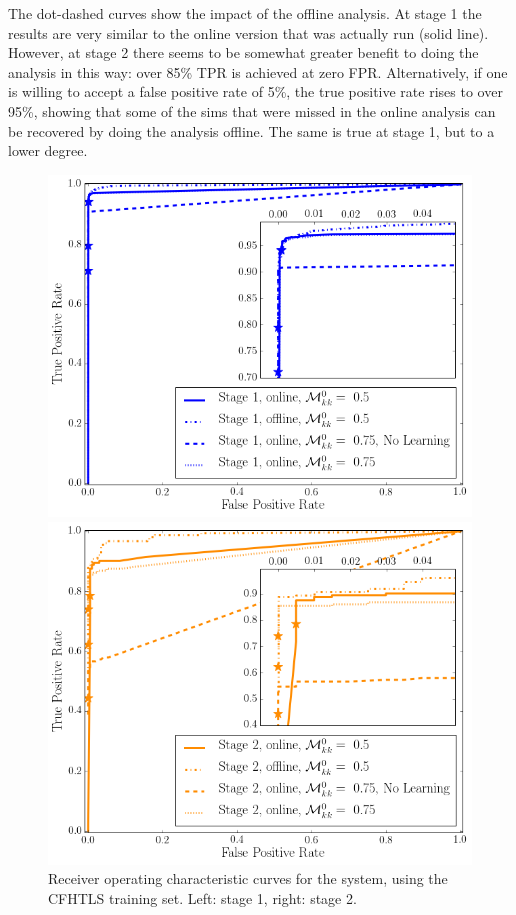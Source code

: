 \documentclass[useAMS,usenatbib,a4paper]{mn2e}
\begin{document}
The dot-dashed curves show the impact of the offline analysis. At stage 1 the
results are very similar to the online version that was actually run (solid
line). However, at stage 2 there seems to be somewhat greater benefit to doing
the analysis in this way: over 85\% TPR is achieved at zero FPR.
Alternatively, if one is willing to accept a false positive rate of 5\%, the
true positive rate rises to over 95\%, showing that some of the sims that were
missed in the online analysis can be recovered by doing the analysis offline.
The same is true at stage 1, but to a lower degree.

\begin{figure}
\begin{minipage}{0.45\linewidth}
  \centering\includegraphics[width=\linewidth]{sw-system-figs/stage1_ROC.png}
\end{minipage}\hfill
\begin{minipage}{0.45\linewidth}
  \centering\includegraphics[width=\linewidth]{sw-system-figs/stage2_ROC.png}
\end{minipage}
\caption{Receiver operating characteristic curves for the \sw system, using
the CFHTLS training set. Left: stage 1, right: stage 2.}
\label{fig:results:sample:roc}
\end{figure}
\end{document}
